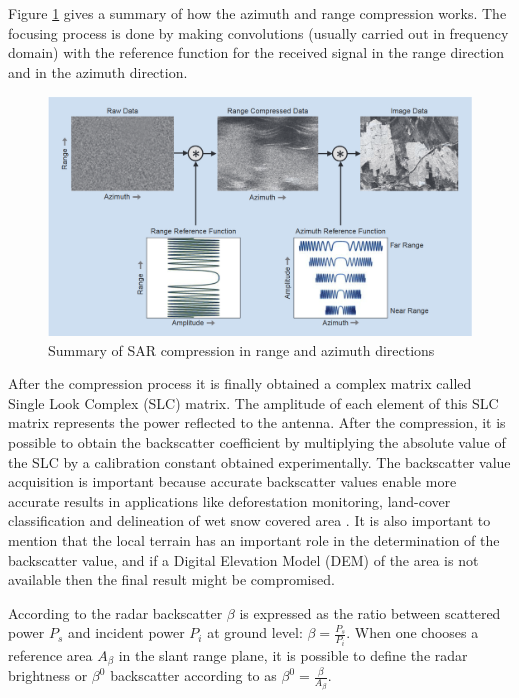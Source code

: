 Figure \ref{fig:sar_compression} gives a summary of how the azimuth and range compression works. The focusing process is done by making convolutions (usually carried out in frequency domain) with the reference function for the received signal in the range direction and in the azimuth direction.
\begin{figure}[H]
    \centering
    \includegraphics[width=\linewidth]{Cap1/compres.png}
    \caption{Summary of SAR compression in range and azimuth directions \cite{tutorial}}
    \label{fig:sar_compression}
\end{figure}

After the compression process it is finally obtained a complex matrix called Single Look Complex (SLC) matrix. The amplitude of each element of this SLC matrix represents the power reflected to the antenna. After the compression, it is possible to obtain the backscatter coefficient by multiplying the absolute value of the SLC by a calibration constant obtained experimentally.
The backscatter value acquisition is important because accurate backscatter values enable more accurate results in applications like deforestation monitoring, land-cover classification and delineation of wet snow covered area \cite{Small}. It is also important to mention that the local terrain has an important role in the determination of the backscatter value, and if a Digital Elevation Model (DEM) of the area is not available then the final result might be compromised.

According to \cite{Small} the radar backscatter $\beta$ is expressed as the ratio between scattered power $P_s$ and incident power $P_i$ at ground level: $\beta = \frac{P_s}{P_i}$. When one chooses a reference area $A_\beta$ in the slant range plane, it is possible to define the radar brightness or  $\beta^0$ backscatter according to \cite{Raney} as $\beta^0 = \frac{\beta}{A_\beta}$.

